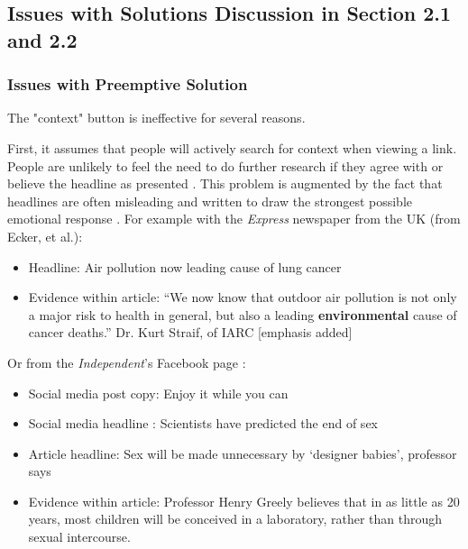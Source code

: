 \documentclass[preprint,review,12pt]{elsarticle}
\begin{document}
 
 
 \subsection{Issues with Solutions Discussion in Section 2.1 and 2.2}
 \subsubsection{Issues with Preemptive Solution}
 The "context" button is ineffective for several reasons. 
 
 First, it assumes that people will actively search for context when viewing a link. People are unlikely to feel the need to do further research if they agree with or believe the headline as presented \cite{nyhan2010corrections}. This problem is augmented by the fact that headlines are often misleading and written to draw the strongest possible emotional response \cite{chesney2017incongruent,ecker2014effects,bell1984good,molek2013towards,kilgo2018new,vettehen2008explaining}. For example with the \textit{Express} newspaper from the UK (from Ecker, et al.):
 \begin{itemize}
 \item Headline: Air pollution now leading cause of lung cancer
\item Evidence within article: “We now know that outdoor air pollution is not only a major risk to health in general, but also a leading \textbf{environmental} cause of cancer deaths.” Dr. Kurt Straif, of IARC [emphasis added]
 \end{itemize}
 
 Or from the \textit{Independent}'s Facebook page \cite{chesney2017incongruent}:
 \begin{itemize}
\item Social media post copy: Enjoy it while you
can
\item Social media headline \footnotemark[1]: Scientists have predicted the end of sex
\item Article headline\footnotemark[2]: Sex will be made unnecessary by ‘designer babies’, professor says
\item Evidence within article: Professor Henry Greely believes that in as little as 20 years, most children will be conceived in a laboratory, rather than through sexual intercourse.
 \end{itemize}
 
\end{document}
